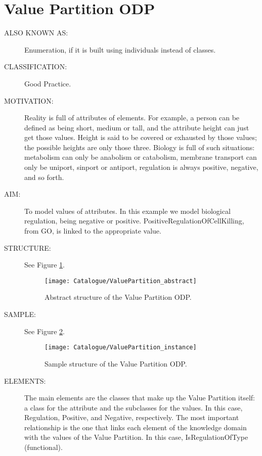  \section{Value Partition ODP}\begin{description}
\item [ALSO KNOWN AS:] Enumeration, if it is built using individuals instead of classes.

\item [CLASSIFICATION:] Good Practice.

\item [MOTIVATION:] Reality is full of attributes of elements. For example, a person can be defined as being short, medium or tall, and the attribute height can just get those values. Height is said to be covered or exhausted by those values; the possible heights are only those three. Biology is full of such situations: metabolism can only be anabolism or catabolism, membrane transport can only be uniport, sinport or antiport, regulation is always positive, negative, and so forth.

\item [AIM:] To model values of attributes. In this example we model biological regulation, being negative or positive. PositiveRegulationOfCellKilling, from GO, is linked to the appropriate value.

\item [STRUCTURE:] See Figure \ref{odp:ValuePartition_abstract}.
\begin{figure}[]\centering\texttt{[image: Catalogue/ValuePartition\_abstract]}\caption{\label{odp:ValuePartition_abstract} Abstract structure of the Value Partition ODP.}\end{figure}

\item [SAMPLE:] See Figure \ref{odp:ValuePartition_instance}.
\begin{figure}[]\centering\texttt{[image: Catalogue/ValuePartition\_instance]}\caption{\label{odp:ValuePartition_instance} Sample structure of the Value Partition ODP.}\end{figure}

\item [ELEMENTS:] The main elements are the classes that make up the Value Partition itself: a class for the attribute and the subclasses for the values. In this case, Regulation, Positive, and Negative, respectively. The most important relationship is the one that links each element of the knowledge domain with the values of the Value Partition. In this case, IsRegulationOfType (functional).


\end{description}
